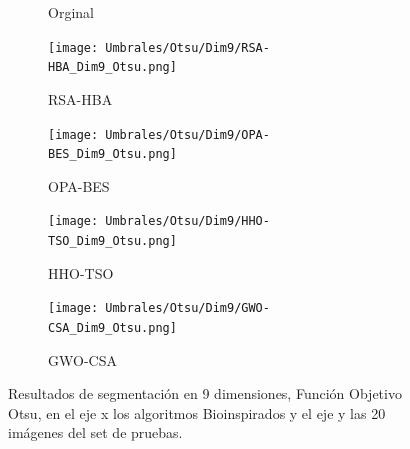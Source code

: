 \documentclass[conference]{IEEEtran}
\begin{document}
\begin{figure}[!htb]
\begin{subfigure}[b]{0.13\textwidth}
		\caption{Orginal}
		\label{fig:imgOrginal}
	\end{subfigure}
	\begin{subfigure}[b]{0.13\textwidth}
		\texttt{[image: Umbrales/Otsu/Dim9/RSA-HBA\_Dim9\_Otsu.png]}
		\caption{RSA-HBA}
		\label{fig:imagen1}
	\end{subfigure}
	\begin{subfigure}[b]{0.13\textwidth}
		\texttt{[image: Umbrales/Otsu/Dim9/OPA-BES\_Dim9\_Otsu.png]}
		\caption{OPA-BES}
		\label{fig:imagen2}
	\end{subfigure}
	\begin{subfigure}[b]{0.13\textwidth}
		\texttt{[image: Umbrales/Otsu/Dim9/HHO-TSO\_Dim9\_Otsu.png]}
		\caption{HHO-TSO}
		\label{fig:imagen2}
	\end{subfigure}
	\begin{subfigure}[b]{0.13\textwidth}
		\texttt{[image: Umbrales/Otsu/Dim9/GWO-CSA\_Dim9\_Otsu.png]}
		\caption{GWO-CSA}
		\label{fig:imagen2}
	\end{subfigure}
	
	
	\caption{Resultados de segmentación en 9 dimensiones, Función Objetivo Otsu, en el eje x los algoritmos Bioinspirados y el eje y las 20 imágenes del set de pruebas.}
	\label{fig:resultados7dim}
\end{figure}
\end{document}
